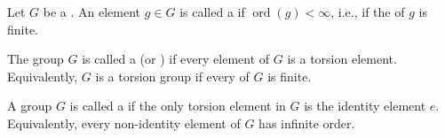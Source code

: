 \begin{definition} \label{definition:torsion_group}
Let $G$ be a . An element $g \in G$ is called a  if $\operatorname{ord}(g) < \infty$, i.e., if the  of $g$ is finite.

The group $G$ is called a  (or ) if every element of $G$ is a torsion element. Equivalently, $G$ is a torsion group if every   of $G$ is finite.

A group $G$ is called a  if the only torsion element in $G$ is the identity element $e$. Equivalently, every non-identity element of $G$ has infinite order.
\end{definition}
